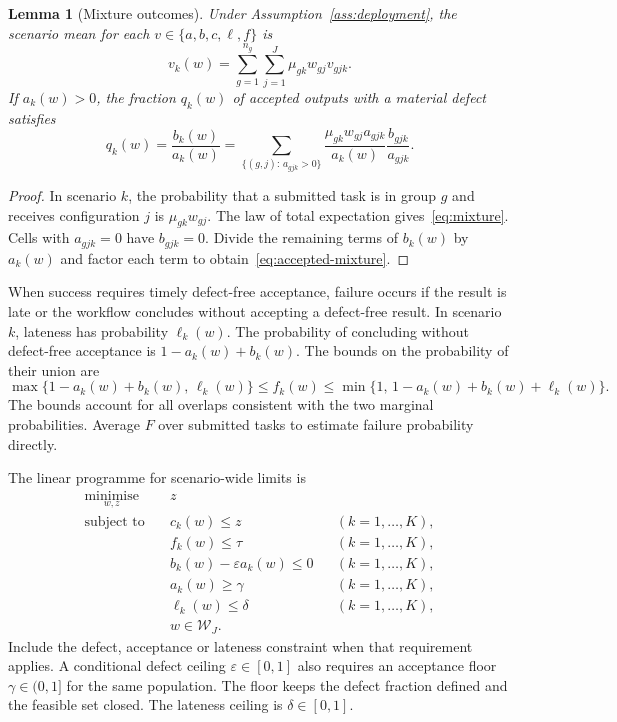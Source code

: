\documentclass[11pt,reqno]{amsart}
\newtheorem{lemma}[theorem]{Lemma}
\theoremstyle{definition}
\theoremstyle{remark}
\begin{document}
\begin{lemma}[Mixture outcomes]\label{lem:mixture}
Under Assumption~\ref{ass:deployment}, the scenario mean for each \(v\in\{a,b,c,\ell,f\}\) is
\begin{equation}
 v_k(w)=\sum_{g=1}^{n_g}\sum_{j=1}^{J}\mu_{gk}w_{gj}v_{gjk}.
 \label{eq:mixture}
\end{equation}
If \(a_k(w)>0\), the fraction \(q_k(w)\) of accepted outputs with a material defect satisfies
\begin{equation}
 q_k(w)=\frac{b_k(w)}{a_k(w)}
       =\sum_{\{(g,j):\,a_{gjk}>0\}}
         \frac{\mu_{gk}w_{gj}a_{gjk}}{a_k(w)}
         \frac{b_{gjk}}{a_{gjk}}.
 \label{eq:accepted-mixture}
\end{equation}
\end{lemma}
\begin{proof}
In scenario \(k\), the probability that a submitted task is in group \(g\) and receives configuration \(j\) is \(\mu_{gk}w_{gj}\). The law of total expectation gives~\eqref{eq:mixture}. Cells with \(a_{gjk}=0\) have \(b_{gjk}=0\). Divide the remaining terms of \(b_k(w)\) by \(a_k(w)\) and factor each term to obtain~\eqref{eq:accepted-mixture}.
\end{proof}

When success requires timely defect-free acceptance, failure occurs if the result is late or the workflow concludes without accepting a defect-free result. In scenario \(k\), lateness has probability \(\ell_k(w)\). The probability of concluding without defect-free acceptance is \(1-a_k(w)+b_k(w)\). The bounds on the probability of their union are
\begin{equation}
 \max\{1-a_k(w)+b_k(w),\,\ell_k(w)\}
 \le f_k(w)
 \le \min\{1,\,1-a_k(w)+b_k(w)+\ell_k(w)\}.
 \label{eq:failure-marginals}
\end{equation}
The bounds account for all overlaps consistent with the two marginal probabilities. Average \(F\) over submitted tasks to estimate failure probability directly.

The linear programme for scenario-wide limits is
\begin{equation}
 \begin{aligned}
 \underset{w,z}{\operatorname{minimise}}\quad &z\\
 \text{subject to}\quad
 &c_k(w)\le z &&(k=1,\ldots,K),\\
 &f_k(w)\le\tau &&(k=1,\ldots,K),\\
 &b_k(w)-\varepsilon a_k(w)\le0 &&(k=1,\ldots,K),\\
 &a_k(w)\ge\gamma &&(k=1,\ldots,K),\\
 &\ell_k(w)\le\delta &&(k=1,\ldots,K),\\
 &w\in\mathcal W_J.
 \end{aligned}
 \label{eq:master}
\end{equation}
Include the defect, acceptance or lateness constraint when that requirement applies. A conditional defect ceiling \(\varepsilon\in[0,1]\) also requires an acceptance floor \(\gamma\in(0,1]\) for the same population. The floor keeps the defect fraction defined and the feasible set closed. The lateness ceiling is \(\delta\in[0,1]\).
\end{document}
